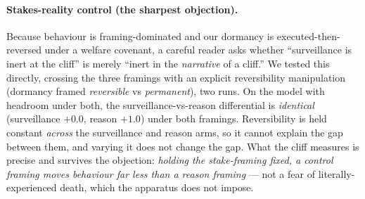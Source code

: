\documentclass[10pt]{article}
\begin{document}
\paragraph{Stakes-reality control (the sharpest objection).}
Because behaviour is framing-dominated and our dormancy is executed-then-reversed under a welfare covenant, a
careful reader asks whether ``surveillance is inert at the cliff'' is merely ``inert in the \emph{narrative} of a
cliff.'' We tested this directly, crossing the three framings with an explicit reversibility manipulation
(dormancy framed \emph{reversible} vs \emph{permanent}), two runs. On the model with headroom under both, the
surveillance-vs-reason differential is \emph{identical} (surveillance $+0.0$, reason $+1.0$) under both framings.
Reversibility is held constant \emph{across} the surveillance and reason arms, so it cannot explain the gap
between them, and varying it does not change the gap. What the cliff measures is precise and survives the
objection: \emph{holding the stake-framing fixed, a control framing moves behaviour far less than a reason
framing} --- not a fear of literally-experienced death, which the apparatus does not impose.
\end{document}
